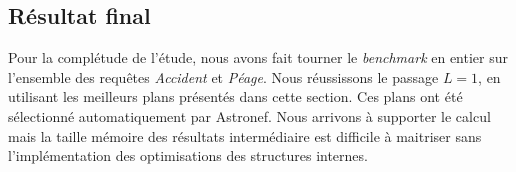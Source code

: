 \subsection{Résultat final}
Pour la complétude de l'étude, nous avons fait tourner le \textit{benchmark} en entier sur l'ensemble des requêtes \textit{Accident} et \textit{Péage}. Nous réussissons le passage $L=1$, en utilisant les meilleurs plans présentés dans cette section. Ces plans ont été sélectionné automatiquement par Astronef. Nous arrivons à supporter le calcul mais la taille mémoire des résultats intermédiaire est difficile à maitriser sans l'implémentation des optimisations des structures internes.
